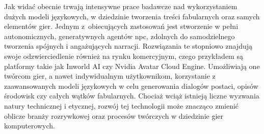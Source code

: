 Jak widać obecnie trwają intensywne prace badawcze nad wykorzystaniem dużych modeli językowych,
w dziedzinie tworzenia treści fabularnych oraz samych elementów gier. Jednym z~obiecujących
zastosowań jest stworzenie w pełni autonomicznych, generatywnych agentów \gls{npc},
zdolnych do samodzielnego tworzenia spójnych i angażujących narracji. Rozwiązania te stopniowo
znajdują swoje odzwierciedlenie również na rynku komercyjnym, czego przykładem są platformy takie
jak Inworld AI czy Nvidia Avatar Cloud Engine. Umożliwiają one twórcom gier, a nawet indywidualnym
użytkownikom, korzystanie z zaawansowanych modeli językowych w celu generowania dialogów postaci,
opisów środowisk czy całych wątków fabularnych. Chociaż wciąż istnieją liczne wyzwania natury
technicznej i etycznej, rozwój tej technologii może znacząco zmienić oblicze branży rozrywkowej
oraz procesów twórczych w dziedzinie gier komputerowych.